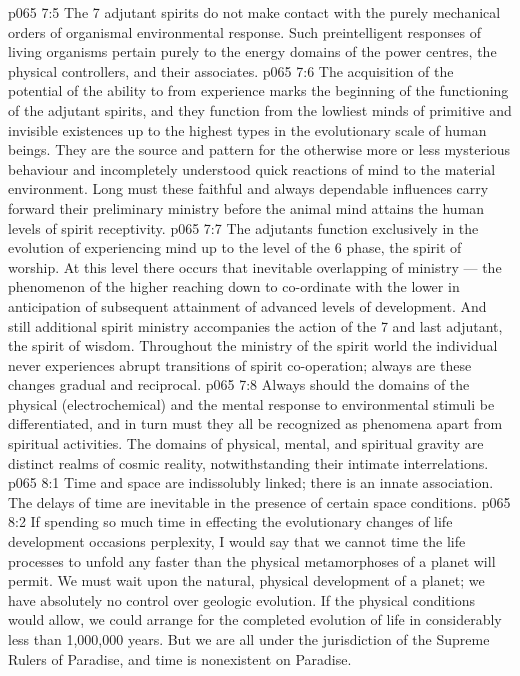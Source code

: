 \vs p065 7:5 The 7 adjutant spirits do not make contact with the purely mechanical orders of organismal environmental response. Such preintelligent responses of living organisms pertain purely to the energy domains of the power centres, the physical controllers, and their associates.
\vs p065 7:6 The acquisition of the potential of the ability to  from experience marks the beginning of the functioning of the adjutant spirits, and they function from the lowliest minds of primitive and invisible existences up to the highest types in the evolutionary scale of human beings. They are the source and pattern for the otherwise more or less mysterious behaviour and incompletely understood quick reactions of mind to the material environment. Long must these faithful and always dependable influences carry forward their preliminary ministry before the animal mind attains the human levels of spirit receptivity.
\vs p065 7:7 The adjutants function exclusively in the evolution of experiencing mind up to the level of the 6 phase, the spirit of worship. At this level there occurs that inevitable overlapping of ministry --- the phenomenon of the higher reaching down to co\hyp{}ordinate with the lower in anticipation of subsequent attainment of advanced levels of development. And still additional spirit ministry accompanies the action of the 7 and last adjutant, the spirit of wisdom. Throughout the ministry of the spirit world the individual never experiences abrupt transitions of spirit co\hyp{}operation; always are these changes gradual and reciprocal.
\vs p065 7:8 Always should the domains of the physical (electrochemical) and the mental response to environmental stimuli be differentiated, and in turn must they all be recognized as phenomena apart from spiritual activities. The domains of physical, mental, and spiritual gravity are distinct realms of cosmic reality, notwithstanding their intimate interrelations.
\vs p065 8:1 Time and space are indissolubly linked; there is an innate association. The delays of time are inevitable in the presence of certain space conditions.
\vs p065 8:2 If spending so much time in effecting the evolutionary changes of life development occasions perplexity, I would say that we cannot time the life processes to unfold any faster than the physical metamorphoses of a planet will permit. We must wait upon the natural, physical development of a planet; we have absolutely no control over geologic evolution. If the physical conditions would allow, we could arrange for the completed evolution of life in considerably less than 1,000,000 years. But we are all under the jurisdiction of the Supreme Rulers of Paradise, and time is nonexistent on Paradise.
